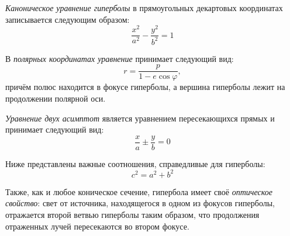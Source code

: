 {\itshape Каноническое уравнение гиперболы} в прямоугольных декартовых координатах записывается следующим образом:\begin{equation}
\frac{x^2}{a^2}-\frac{y^2}{b^2}=1
\end{equation}

В {\itshape полярных координатах уравнение} принимает следующий вид:\begin{equation}
r=\frac{p}{1-e\cos\varphi},
\end{equation}
причём полюс находится в фокусе гиперболы, а вершина гиперболы лежит на продолжении полярной оси.

{\itshape Уравнение двух асимптот} является уравнением пересекающихся прямых и принимает следующий вид:\begin{equation}
\frac{x}{a}\pm\frac{y}{b}=0
\end{equation}

Ниже представлены важные соотношения, справедливые для гиперболы:
\begin{equation}
c^2=a^2+b^2
\end{equation}

Также, как и любое коническое сечение, гипербола имеет своё {\itshape оптическое свойство}: свет от источника, находящегося в одном из фокусов гиперболы, отражается второй ветвью гиперболы таким образом, что продолжения отраженных лучей пересекаются во втором фокусе.
